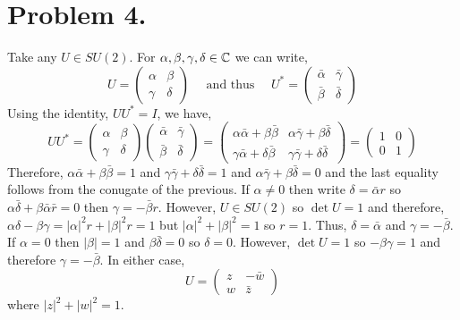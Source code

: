 \documentclass[12pt]{extarticle}
\begin{document}
\section*{Problem 4.}

Take any $U \in SU(2)$. For $\alpha, \beta, \gamma, \delta \in \mathbb{C}$ we can write,
\[ 
U =
\begin{pmatrix}
\alpha & \beta \\
\gamma & \delta 
\end{pmatrix}
\quad \text{ and thus } \quad 
U^* = 
\begin{pmatrix}
\bar{\alpha} & \bar{\gamma} \\
\bar{\beta} & \bar{\delta} 
\end{pmatrix}
\]
Using the identity, $U U^{*} = I$, we have,
\[ 
UU^* =
\begin{pmatrix}
\alpha & \beta \\
\gamma & \delta 
\end{pmatrix}
\begin{pmatrix}
\bar{\alpha} & \bar{\gamma} \\
\bar{\beta} & \bar{\delta} 
\end{pmatrix}
= 
\begin{pmatrix}
\alpha \bar{\alpha} + \beta \bar{\beta} & \alpha \bar{\gamma} + \beta \bar{\delta} \\
\gamma \bar{\alpha} + \delta \bar{\beta} & \gamma \bar{\gamma} + \delta \bar{\delta} 
\end{pmatrix}
= 
\begin{pmatrix}
1 & 0 \\
0 & 1
\end{pmatrix}
\]
Therefore, $\alpha \bar{\alpha} + \beta \bar{\beta} = 1$ and $\gamma \bar{\gamma} + \delta \bar{\delta} = 1$ and $ \alpha \bar{\gamma} + \beta \bar{\delta} = 0$ and the last equality follows from the conugate of the previous. If $\alpha \neq 0$ then write $\delta = \bar{\alpha} r$ so $\alpha \bar{\delta} + \beta \bar{\alpha} \bar{r} = 0$ then $\gamma = - \bar{\beta} r$. However, $U \in SU(2)$ so $\det{U} = 1$ and therefore, $\alpha \delta - \beta \gamma = |\alpha|^2 r + |\beta|^2 r = 1$ but $|\alpha|^2 + |\beta|^2 = 1$ so $r = 1$. Thus, $\delta = \bar{\alpha}$ and $\gamma = - \bar{\beta}$. \bigskip \\ If $\alpha = 0$ then $|\beta| = 1$ and $\beta \bar{\delta} = 0$ so $\delta = 0$. However, $\det{U} = 1$ so $-\beta \gamma = 1$ and therefore $\gamma = -\bar{\beta}$. In either case,
\[
U = 
\begin{pmatrix}
z & - \bar{w} \\
w & \bar{z} 
\end{pmatrix} \]
where $|z|^2 + |w|^2 = 1$. 
\end{document}
